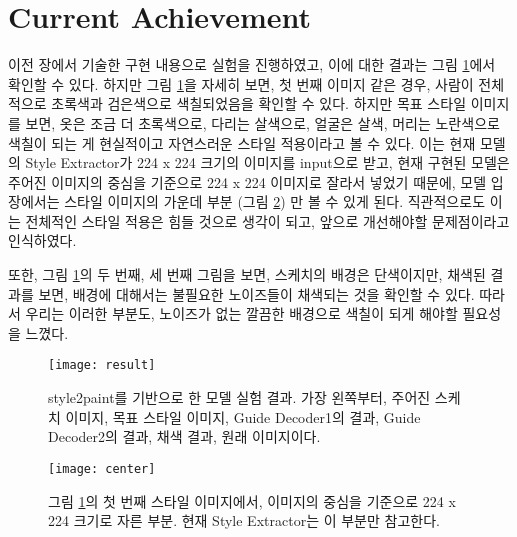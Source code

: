 \section{Current Achievement}

이전 장에서 기술한 구현 내용으로 실험을 진행하였고, 이에 대한 결과는 그림 \ref{fig:current}에서 확인할 수 있다.
하지만 그림 \ref{fig:current}을 자세히 보면, 첫 번째 이미지 같은 경우, 사람이 전체적으로 초록색과 검은색으로 색칠되었음을 확인할 수 있다.
하지만 목표 스타일 이미지를 보면, 옷은 조금 더 초록색으로, 다리는 살색으로, 얼굴은 살색, 머리는 노란색으로 색칠이 되는 게 현실적이고 자연스러운 스타일 적용이라고 볼 수 있다.
이는 현재 모델의 Style Extractor가 224 x 224 크기의 이미지를 input으로 받고, 현재 구현된 모델은 주어진 이미지의 중심을 기준으로 224 x 224 이미지로 잘라서 넣었기 때문에, 모델 입장에서는 스타일 이미지의 가운데 부분 (그림 \ref{fig:center}) 만 볼 수 있게 된다. 직관적으로도 이는 전체적인 스타일 적용은 힘들 것으로 생각이 되고, 앞으로 개선해야할 문제점이라고 인식하였다.

또한, 그림 \ref{fig:current}의 두 번째, 세 번째 그림을 보면, 스케치의 배경은 단색이지만, 채색된 결과를 보면, 배경에 대해서는 불필요한 노이즈들이 채색되는 것을 확인할 수 있다.
따라서 우리는 이러한 부분도, 노이즈가 없는 깔끔한 배경으로 색칠이 되게 해야할 필요성을 느꼈다.
\begin{figure}[t]
	\centering
	\texttt{[image: result]}
	\caption{style2paint를 기반으로 한 모델 실험 결과. 가장 왼쪽부터, 주어진 스케치 이미지, 목표 스타일 이미지, Guide Decoder1의 결과, Guide Decoder2의 결과, 채색 결과, 원래 이미지이다.}
	\label{fig:current}
\end{figure}

\begin{figure}[t]
	\centering
	\texttt{[image: center]}
	\caption{그림 \ref{fig:current}의 첫 번째 스타일 이미지에서, 이미지의 중심을 기준으로 224 x 224 크기로 자른 부분. 현재 Style Extractor는 이 부분만 참고한다.}
	\label{fig:center}
\end{figure}

